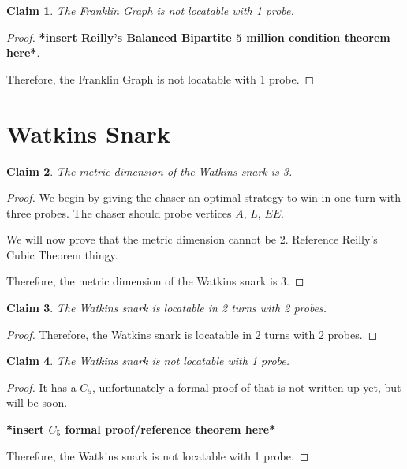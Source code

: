 \documentclass[11pt]{article}
\newtheorem{clm}{Claim}
\begin{document}
	\begin{clm}
		The Franklin Graph is not locatable with 1 probe.
	\end{clm}
	\begin{proof}
		\textbf{*insert Reilly's Balanced Bipartite 5 million condition theorem here*}.
		
		Therefore, the Franklin Graph is not locatable with 1 probe.
	\end{proof}
	\newpage
	
	\section{Watkins Snark}
	\begin{clm}
		The metric dimension of the Watkins snark is 3.
	\end{clm}
	\begin{proof}
		We begin by giving the chaser an optimal strategy to win in one turn with three probes. The chaser should probe vertices $A$, $L$, $EE$.
		
		We will now prove that the metric dimension cannot be 2. Reference Reilly's Cubic Theorem thingy.
		
		Therefore, the metric dimension of the Watkins snark is 3.
	\end{proof}
	\begin{clm}
		The Watkins snark is locatable in 2 turns with 2 probes.
	\end{clm}
	\begin{proof}
		Therefore, the Watkins snark is locatable in 2 turns with 2 probes.
	\end{proof}
	\begin{clm}
		The Watkins snark is not locatable with 1 probe.
	\end{clm}
	\begin{proof}
		It has a $C_5$, unfortunately a formal proof of that is not written up yet, but will be soon.
		
		\textbf{*insert $C_5$ formal proof/reference theorem here*}
		
		Therefore, the Watkins snark is not locatable with 1 probe.
	\end{proof}
\end{document}
